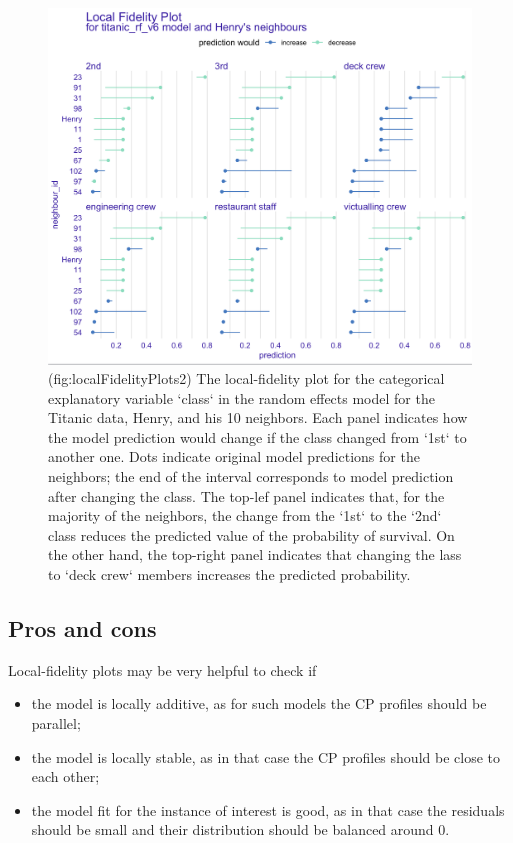 \documentclass[12pt,]{krantz}
\providecommand{\tightlist}{%
  \setlength{\itemsep}{0pt}\setlength{\parskip}{0pt}}
\begin{document}
\begin{figure}

{\centering \includegraphics[width=0.7\linewidth]{figure/cp_fidelity_2} 

}

\caption{(fig:localFidelityPlots2) The local-fidelity plot for the categorical explanatory variable `class` in the random effects model for the Titanic data, Henry, and his 10 neighbors. Each panel indicates how the model prediction would change if the class changed from  `1st` to another one. Dots indicate original model predictions for the neighbors; the end of the interval corresponds to model prediction after changing the class. The top-lef panel indicates that, for the majority of the neighbors, the change from the `1st` to the `2nd` class reduces the predicted value of the probability of survival. On the other hand, the top-right panel indicates that changing the lass to `deck crew` members increases the predicted probability.}\label{fig:localFidelityPlots2}
\end{figure}

\hypertarget{cPLocDiagProsCons}{%
\subsection{Pros and cons}\label{cPLocDiagProsCons}}

Local-fidelity plots may be very helpful to check if

\begin{itemize}
\tightlist
\item
  the model is locally additive, as for such models the CP profiles should be parallel;
\item
  the model is locally stable, as in that case the CP profiles should be close to each other;
\item
  the model fit for the instance of interest is good, as in that case the residuals should be small and their distribution should be balanced around 0.
\end{itemize}
\end{document}
